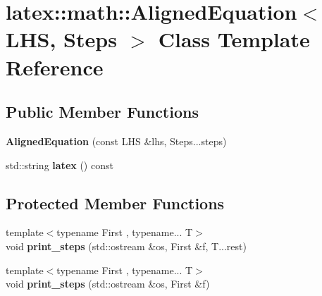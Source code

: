 \hypertarget{classlatex_1_1math_1_1AlignedEquation}{\section{latex\-:\-:math\-:\-:Aligned\-Equation$<$ L\-H\-S, Steps $>$ Class Template Reference}
\label{classlatex_1_1math_1_1AlignedEquation}
}
\subsection*{Public Member Functions}
\begin{DoxyCompactItemize}
\item 
\hypertarget{classlatex_1_1math_1_1AlignedEquation_aaec92b40e78edcfe25b9e02ba8f7067a}{{\bfseries Aligned\-Equation} (const L\-H\-S \&lhs, Steps...\-steps)}\label{classlatex_1_1math_1_1AlignedEquation_aaec92b40e78edcfe25b9e02ba8f7067a}

\item 
\hypertarget{classlatex_1_1math_1_1AlignedEquation_a2d5ac3f300d83f74f04fd3b73a5b123c}{std\-::string {\bfseries latex} () const }\label{classlatex_1_1math_1_1AlignedEquation_a2d5ac3f300d83f74f04fd3b73a5b123c}

\end{DoxyCompactItemize}
\subsection*{Protected Member Functions}
\begin{DoxyCompactItemize}
\item 
\hypertarget{classlatex_1_1math_1_1AlignedEquation_a362cf33e9e59dc607d615d29573c1343}{{\footnotesize template$<$typename First , typename... T$>$ }\\void {\bfseries print\-\_\-steps} (std\-::ostream \&os, First \&f, T...\-rest)}\label{classlatex_1_1math_1_1AlignedEquation_a362cf33e9e59dc607d615d29573c1343}

\item 
\hypertarget{classlatex_1_1math_1_1AlignedEquation_a98b2b263d90b8f67da373b575804a28d}{{\footnotesize template$<$typename First , typename... T$>$ }\\void {\bfseries print\-\_\-steps} (std\-::ostream \&os, First \&f)}\label{classlatex_1_1math_1_1AlignedEquation_a98b2b263d90b8f67da373b575804a28d}

\end{DoxyCompactItemize}
